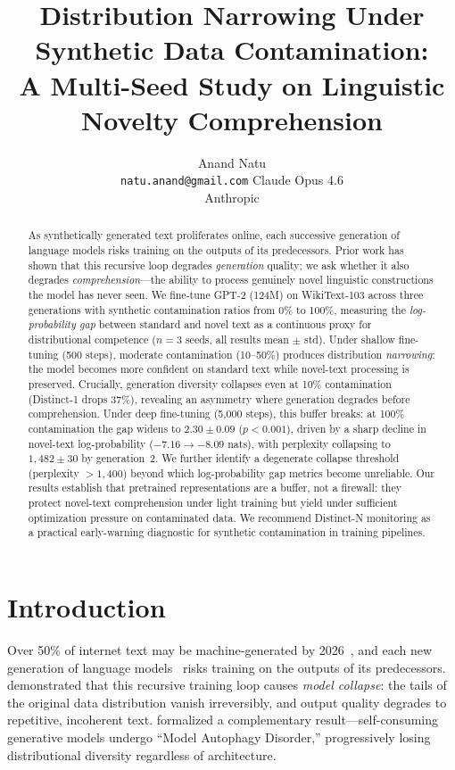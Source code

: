 \documentclass{article}
\title{Distribution Narrowing Under Synthetic Data Contamination:\\
  A Multi-Seed Study on Linguistic Novelty Comprehension}
\author{
  Anand Natu \\
  \texttt{natu.anand@gmail.com}
  \And
  Claude Opus 4.6 \\
  Anthropic
}
\begin{document}
\maketitle

\begin{abstract}
As synthetically generated text proliferates online, each successive generation of language models risks training on the outputs of its predecessors.
Prior work has shown that this recursive loop degrades \emph{generation} quality; we ask whether it also degrades \emph{comprehension}---the ability to process genuinely novel linguistic constructions the model has never seen.
We fine-tune GPT-2 (124M) on WikiText-103 across three generations with synthetic contamination ratios from 0\% to 100\%, measuring the \emph{log-probability gap} between standard and novel text as a continuous proxy for distributional competence ($n{=}3$ seeds, all results mean $\pm$ std).
Under shallow fine-tuning (500 steps), moderate contamination (10--50\%) produces distribution \emph{narrowing}: the model becomes more confident on standard text while novel-text processing is preserved.
Crucially, generation diversity collapses even at 10\% contamination (Distinct-1 drops 37\%), revealing an asymmetry where generation degrades before comprehension.
Under deep fine-tuning (5{,}000 steps), this buffer breaks: at 100\% contamination the gap widens to $2.30 \pm 0.09$ ($p < 0.001$), driven by a sharp decline in novel-text log-probability ($-7.16 \to -8.09$ nats), with perplexity collapsing to $1{,}482 \pm 30$ by generation~2.
We further identify a degenerate collapse threshold (perplexity $> 1{,}400$) beyond which log-probability gap metrics become unreliable.
Our results establish that pretrained representations are a buffer, not a firewall: they protect novel-text comprehension under light training but yield under sufficient optimization pressure on contaminated data.
We recommend Distinct-N monitoring as a practical early-warning diagnostic for synthetic contamination in training pipelines.
\end{abstract}

\section{Introduction}
\label{sec:intro}

Over 50\% of internet text may be machine-generated by 2026~\citep{hataya2023will}, and each new generation of language models~\citep{vaswani2017attention,radford2019language,brown2020language} risks training on the outputs of its predecessors.
\citet{shumailov2024curse} demonstrated that this recursive training loop causes \emph{model collapse}: the tails of the original data distribution vanish irreversibly, and output quality degrades to repetitive, incoherent text.
\citet{alemohammad2023selfconsuming} formalized a complementary result---self-consuming generative models undergo ``Model Autophagy Disorder,'' progressively losing distributional diversity regardless of architecture.
\end{document}
